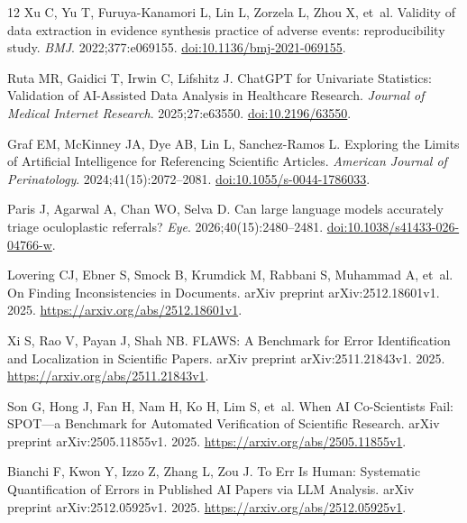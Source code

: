 \begin{thebibliography}{12}
Xu C, Yu T, Furuya-Kanamori L, Lin L, Zorzela L, Zhou X, et~al. Validity of data extraction in evidence synthesis practice of adverse events: reproducibility study.
\emph{BMJ}. 2022;377:e069155.
\href{https://doi.org/10.1136/bmj-2021-069155}{doi:10.1136/bmj-2021-069155}.

Ruta MR, Gaidici T, Irwin C, Lifshitz J. {ChatGPT} for Univariate Statistics: Validation of {AI}-Assisted Data Analysis in Healthcare Research.
\emph{Journal of Medical Internet Research}. 2025;27:e63550.
\href{https://doi.org/10.2196/63550}{doi:10.2196/63550}.

Graf EM, McKinney JA, Dye AB, Lin L, Sanchez-Ramos L. Exploring the Limits of Artificial Intelligence for Referencing Scientific Articles.
\emph{American Journal of Perinatology}. 2024;41(15):2072--2081.
\href{https://doi.org/10.1055/s-0044-1786033}{doi:10.1055/s-0044-1786033}.

Paris J, Agarwal A, Chan WO, Selva D. Can large language models accurately triage oculoplastic referrals?
\emph{Eye}. 2026;40(15):2480--2481.
\href{https://doi.org/10.1038/s41433-026-04766-w}{doi:10.1038/s41433-026-04766-w}.

Lovering CJ, Ebner S, Smock B, Krumdick M, Rabbani S, Muhammad A, et~al. On Finding Inconsistencies in Documents.
arXiv preprint arXiv:2512.18601v1. 2025.
\url{https://arxiv.org/abs/2512.18601v1}.

Xi S, Rao V, Payan J, Shah NB. {FLAWS}: A Benchmark for Error Identification and Localization in Scientific Papers.
arXiv preprint arXiv:2511.21843v1. 2025.
\url{https://arxiv.org/abs/2511.21843v1}.

Son G, Hong J, Fan H, Nam H, Ko H, Lim S, et~al. When {AI} Co-Scientists Fail: {SPOT}---a Benchmark for Automated Verification of Scientific Research.
arXiv preprint arXiv:2505.11855v1. 2025.
\url{https://arxiv.org/abs/2505.11855v1}.

Bianchi F, Kwon Y, Izzo Z, Zhang L, Zou J. To Err Is Human: Systematic Quantification of Errors in Published {AI} Papers via {LLM} Analysis.
arXiv preprint arXiv:2512.05925v1. 2025.
\url{https://arxiv.org/abs/2512.05925v1}.


\end{thebibliography}
